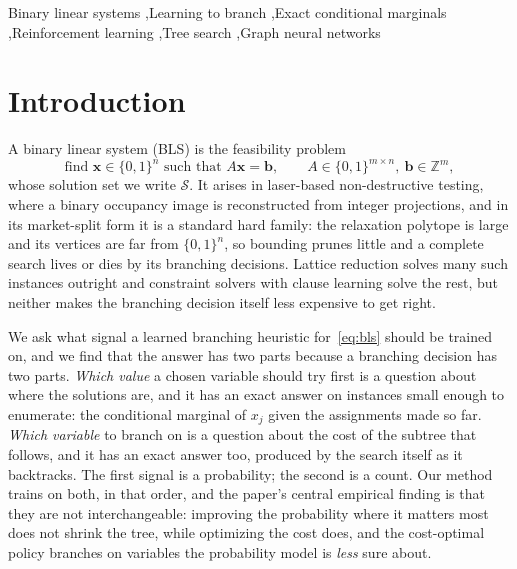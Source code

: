 \documentclass[final,5p,times,twocolumn]{elsarticle}
\newcommand{\SOL}{\mathcal{S}}
\begin{document}
\begin{frontmatter}
\begin{abstract}
\end{abstract}

\begin{keyword}
Binary linear systems \sep Learning to branch \sep Exact conditional marginals \sep Reinforcement learning \sep Tree search \sep Graph neural networks
\end{keyword}

\end{frontmatter}

\section{Introduction}
\label{sec:intro}

A binary linear system (BLS) is the feasibility problem
\begin{equation}
\text{find } \mathbf{x}\in\{0,1\}^n \text{ such that } A\mathbf{x}=\mathbf{b},\qquad A\in\{0,1\}^{m\times n},\ \mathbf{b}\in\mathbb{Z}^m,
\label{eq:bls}
\end{equation}
whose solution set we write $\SOL$. It arises in laser-based non-destructive testing, where a binary occupancy image is reconstructed from integer projections, and in its market-split form \citep{cornuejols1999class} it is a standard hard family: the relaxation polytope is large and its vertices are far from $\{0,1\}^n$, so bounding prunes little and a complete search lives or dies by its branching decisions. Lattice reduction \citep{aardal2000diophantine} solves many such instances outright and constraint solvers with clause learning solve the rest, but neither makes the branching decision itself less expensive to get right.

We ask what signal a learned branching heuristic for~\eqref{eq:bls} should be trained on, and we find that the answer has two parts because a branching decision has two parts. \emph{Which value} a chosen variable should try first is a question about where the solutions are, and it has an exact answer on instances small enough to enumerate: the conditional marginal of $x_j$ given the assignments made so far. \emph{Which variable} to branch on is a question about the cost of the subtree that follows, and it has an exact answer too, produced by the search itself as it backtracks. The first signal is a probability; the second is a count. Our method trains on both, in that order, and the paper's central empirical finding is that they are not interchangeable: improving the probability where it matters most does not shrink the tree, while optimizing the cost does, and the cost-optimal policy branches on variables the probability model is \emph{less} sure about.
\end{document}
